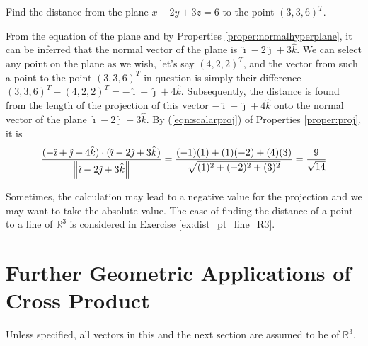 \begin{exmp}
Find the distance from the plane $x-2y+3z = 6$ to the point $(3,3,6)^T$.
\end{exmp}
\begin{solution}
From the equation of the plane and by Properties \ref{proper:normalhyperplane}, it can be inferred that the normal vector of the plane is $\hat{\imath} - 2\hat{\jmath} + 3\hat{k}$. We can select any point on the plane as we wish, let's say $(4,2,2)^T$, and the vector from such a point to the point $(3,3,6)^T$ in question is simply their difference $(3,3,6)^T - (4,2,2)^T = -\hat{\imath} + \hat{\jmath} + 4\hat{k}$. Subsequently, the distance is found from the length of the projection of this vector $-\hat{\imath} + \hat{\jmath} + 4\hat{k}$ onto the normal vector of the plane $\hat{\imath} - 2\hat{\jmath} + 3\hat{k}$. By (\ref{eqn:scalarproj}) of Properties \ref{proper:proj}, it is
\begin{align*}
\frac{(-\hat{\imath} + \hat{\jmath} + 4\hat{k}) \cdot (\hat{\imath} - 2\hat{\jmath} + 3\hat{k})}{\norm{\hat{\imath} - 2\hat{\jmath} + 3\hat{k}}} = \frac{(-1)(1)+(1)(-2)+(4)(3)}{\sqrt{(1)^2 + (-2)^2 + (3)^2}} = \frac{9}{\sqrt{14}}
\end{align*}
\end{solution}
Sometimes, the calculation may lead to a negative value for the projection and we may want to take the absolute value. The case of finding the distance of a point to a line of $\mathbb{R}^3$ is considered in Exercise \ref{ex:dist_pt_line_R3}.

\section{Further Geometric Applications of Cross Product}
Unless specified, all vectors in this and the next section are assumed to be of $\mathbb{R}^3$.

